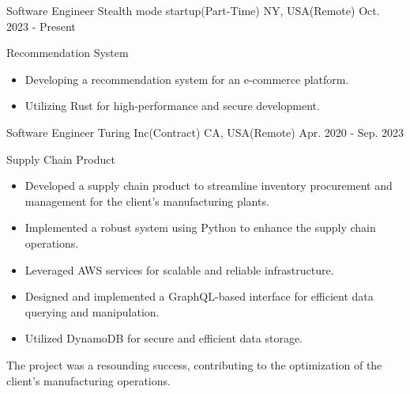 

\begin{cventries}

  \cventry
  {Software Engineer} %
  {Stealth mode startup(Part-Time)} %
  {NY, USA(Remote)} %
  {Oct. 2023 - Present} %
  {
    \begin{cvitems} %
      \item {Recommendation System}
      \begin {itemize}
        \item Developing a recommendation system for an e-commerce platform.
        \item Utilizing Rust for high-performance and secure development.
      \end{itemize}
    \end{cvitems}
  }
  \cventry
    {Software Engineer} %
    {Turing Inc(Contract)} %
    {CA, USA(Remote)} %
    {Apr. 2020 - Sep. 2023} %
    {
      \begin{cvitems} %
        \item {Supply Chain Product}
        \begin {itemize}
          \item Developed a supply chain product to streamline inventory procurement and management for the client's manufacturing plants.
          \item Implemented a robust system using Python to enhance the supply chain operations.
          \item Leveraged AWS services for scalable and reliable infrastructure.
          \item Designed and implemented a GraphQL-based interface for efficient data querying and manipulation.
          \item Utilized DynamoDB for secure and efficient data storage.
          \end{itemize}
        The project was a resounding success, contributing to the optimization of the client's manufacturing operations.

\end{cvitems}}
\end{cventries}
